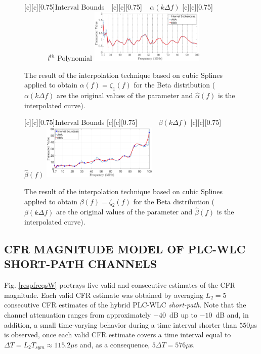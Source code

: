 \documentclass[journal]{IEEEtran}
\begin{document}
\begin{figure}[h]
	\centering
	[c][0.75]{Interval Bounds$~~~$}
	[c][0.75]{$~~~~~{\alpha}(k \Delta f)$}
	[c][0.75]{$~~~~~~~~~~~~~~~l^{th}$ Polynomial}
	\includegraphics[width=0.49\textwidth]{images/SPLINE_Polynomials.eps}
	\caption{The result of the interpolation technique based on cubic Splines applied to obtain $\alpha(f)=\zeta_1(f)$ for the Beta distribution (${\alpha}(k \Delta f)$ are the original values of the parameter and $\hat{\alpha}(f)$ is the interpolated curve).}
	\label{Fit_alfa_poli}
\end{figure}

\begin{figure}[h!]
	\centering
	[c][0.75]{Interval Bounds}
	[c][0.75]{~~~~~~$\beta(k \Delta f)$}
	[c][0.75]{~~$\hat{\beta}(f)$}
	\includegraphics[width=0.49\textwidth]{images/Beta_fit_1.7.eps}
	\caption{The result of the interpolation technique based on cubic Splines applied to obtain $\beta(f) = \zeta_2(f)$ for the Beta distribution ($\beta(k \Delta f)$ are the original values of the parameter and $\hat{\beta}(f)$ is the interpolated curve).}
	\label{Fit_beta}
\end{figure}

\subsection{CFR MAGNITUDE MODEL OF PLC-WLC SHORT-PATH CHANNELS}\label{sec:MMHYBS}

 Fig. \ref{respfreqsW} portrays five valid and consecutive estimates of the \ac{CFR} magnitude. Each valid \ac{CFR} estimate was obtained by averaging  $L_2=5$ consecutive \ac{CFR} estimates of the hybrid \ac{PLC}-\ac{WLC} \textit{short-path}. Note that the channel attenuation ranges from approximately $-40$~dB up to $-10$~dB and, in addition, a small time-varying behavior during a time interval shorter than $550\mu$s is observed, once each valid \ac{CFR} estimate covers a time interval equal to $\Delta T = L_2 T_{sym} \approx 115.2\mu$s and, as a consequence, $5\Delta T = 576\mu$s. 
\end{document}
